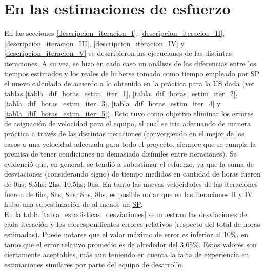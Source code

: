 \documentclass[a4paper, 12pt,twoside]{report}  %
\numberwithin{equation}{subsection} %
\begin{document}
\section{En las estimaciones de esfuerzo}
\label{comparacion_estimaciones_de_esfuerzo}
En las secciones \ref{descripcion_iteracion_I}, \ref{descripcion_iteracion_II}, \ref{descripcion_iteracion_III}, \ref{descripcion_iteracion_IV} y \ref{descripcion_iteracion_V} se describieron las ejecuciones de las distintas iteraciones. A su vez, se hizo en cada caso un análisis de las diferencias entre los tiempos estimados y los reales de haberse tomado como tiempo empleado por \hyperlink{SP}{SP} el nuevo calculado de acuerdo a lo obtenido en la práctica para la \hyperlink{US}{US} dada (ver tablas \ref{tabla_dif_horas_estim_iter_1}, \ref{tabla_dif_horas_estim_iter_2}, \ref{tabla_dif_horas_estim_iter_3}, \ref{tabla_dif_horas_estim_iter_4} y \ref{tabla_dif_horas_estim_iter_5}). Esto tuvo como objetivo eliminar los errores de asignación de velocidad para el equipo, el cual se iría adecuando de manera práctica a través de las distintas iteraciones (convergiendo en el mejor de los casos a una velocidad adecuada para todo el proyecto, siempre que se cumpla la premisa de tener condiciones no demasiado disímiles entre iteraciones). Se evidenció que, en general, se tendió a subestimar el esfuerzo, ya que la suma de desviaciones (considerando signo) de tiempo medidos en cantidad de horas fueron de 0hs; 8,5hs; 2hs; 10,5hs; 0hs. En tanto las nuevas velocidades de las iteraciones fueron de 6hs, 8hs, 8hs, 8hs, 8hs, es posible notar que en las iteraciones II y IV hubo una subestimación de al menos un \hyperlink{SP}{SP}.\\
En la tabla \ref{tabla_estadisticas_desviaciones} se muestran las desviaciones de cada iteración y los correspondientes errores relativos (respecto del total de horas estimadas). Puede notarse que el valor máximo de error es inferior al 10\%, en tanto que el error relativo promedio es de alrededor del 3,65\%. Estos valores son ciertamente aceptables, más aún teniendo en cuenta la falta de experiencia en estimaciones similares por parte del equipo de desarrollo.
\end{document}
